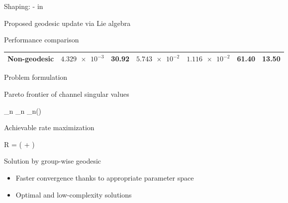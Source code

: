 \documentclass[presentation,xcolor={table},9pt]{beamer}
\begin{document}
\begin{section}{Shaping: - in }
\begin{frame}{Proposed geodesic update via Lie algebra}
\begin{exampleblock}{Performance comparison}
\begin{table}
\begin{tabular}{ccccccc}
					Non-geodesic                    & $\num{4.329e-3}$                      & 30.92                                  & $\num{5.743e-2}$ & $\num{1.116e-2}$ & 61.40      & 13.50    \\ \bottomrule
				\end{tabular}
			\end{table}
		\end{exampleblock}
	\end{frame}

	\begin{frame}{Problem formulation}
		\begin{block}{Pareto frontier of channel singular values}
			\vspace{-0.25cm}
			\begin{maxi*}
				{\scriptstyle{\mathbf{\Theta}}}{\sum_n \rho_n \sigma_n()}{}{}
			\end{maxi*}
		\end{block}
		\begin{block}{Achievable rate maximization}
			\vspace{-0.25cm}
			\begin{maxi*}
				{}{R = \log \det \biggl( + \biggr)}{}{}
				\addConstraint{\lVert \mathbf{W} \rVert _\mathrm{F}^2}{\le P}
				\addConstraint{\mathbf{\Theta}_g^\mathsf{H} \mathbf{\Theta}_g}{=\mathbf{I}, \quad \forall g.}
			\end{maxi*}
		\end{block}
		\begin{exampleblock}{Solution by group-wise geodesic }
			\begin{itemize}
				\item Faster convergence thanks to appropriate parameter space
				\item Optimal and low-complexity solutions
			\end{itemize}
		\end{exampleblock}
	\end{frame}


\end{section}
\end{document}
